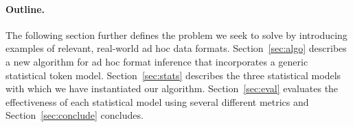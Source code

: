 \paragraph*{Outline.}
The following section further defines the problem we seek to solve
by introducing examples of relevant, real-world ad hoc data formats.
Section~\ref{sec:algo} describes a new algorithm for ad hoc format
inference that incorporates a generic statistical token model.
Section~\ref{sec:stats} describes the three statistical models with
which we have
instantiated our algorithm.  Section~\ref{sec:eval} evaluates the
effectiveness of each statistical model using several different
metrics and Section~\ref{sec:conclude} concludes.
